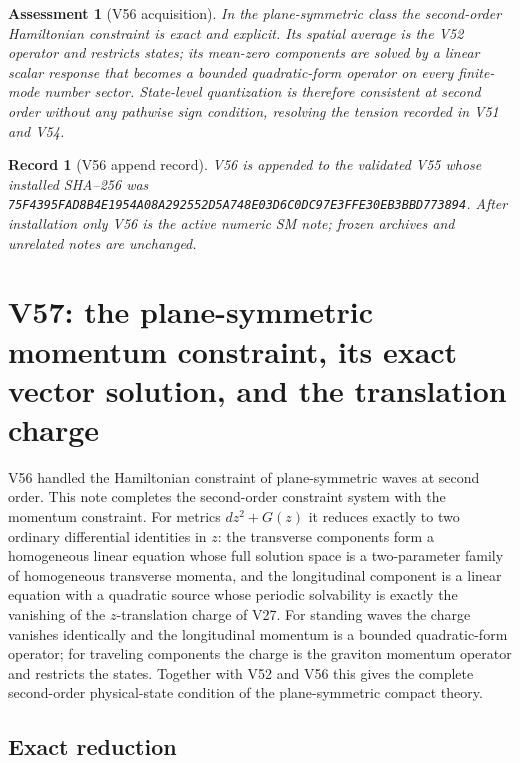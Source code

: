 \documentclass[11pt]{article}
\newtheorem{assessment}[theorem]{Assessment}
\newtheorem{record}[theorem]{Record}
\theoremstyle{remark}
\begin{document}
\begin{assessment}[V56 acquisition]
\label{ass:v19v56}
In the plane-symmetric class the second-order Hamiltonian constraint
is exact and explicit.  Its spatial average is the V52 operator and
restricts states; its mean-zero components are solved by a linear
scalar response that becomes a bounded quadratic-form operator on
every finite-mode number sector.  State-level quantization is
therefore consistent at second order without any pathwise sign
condition, resolving the tension recorded in V51 and V54.
\end{assessment}

\begin{record}[V56 append record]
\label{rec:v19v56}
V56 is appended to the validated V55 whose installed SHA--256 was
\texttt{75F4395FAD8B4E1954A08A292552D5A748E03D6C0DC97E3FFE30EB3BBD773894}.
After installation only V56 is the active numeric SM note; frozen
archives and unrelated notes are unchanged.
\end{record}


\section{V57: the plane-symmetric momentum constraint, its exact vector solution, and the translation charge}
\label{sec:v19v57}

V56 handled the Hamiltonian constraint of plane-symmetric waves at
second order.  This note completes the second-order constraint system
with the momentum constraint.  For metrics \(dz^2+G(z)\) it reduces
exactly to two ordinary differential identities in \(z\): the
transverse components form a homogeneous linear equation whose full
solution space is a two-parameter family of homogeneous transverse
momenta, and the longitudinal component is a linear equation with a
quadratic source whose periodic solvability is exactly the vanishing of
the \(z\)-translation charge of V27.  For standing waves the charge
vanishes identically and the longitudinal momentum is a bounded
quadratic-form operator; for traveling components the charge is the
graviton momentum operator and restricts the states.  Together with
V52 and V56 this gives the complete second-order physical-state
condition of the plane-symmetric compact theory.

\subsection{Exact reduction}
\end{document}
